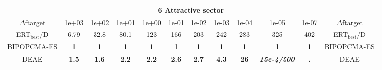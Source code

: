 \begin{tabular}{cccccccccccc}
 & \multicolumn{10}{c}{{\normalsize \textbf{6 Attractive sector}}}\\
$\Delta$ftarget& 1e+03& 1e+02& 1e+01& 1e+00& 1e-01& 1e-02& 1e-03& 1e-04& 1e-05& 1e-07 & $\Delta$ftarget \\
ERT$_{\textrm{best}}$/D& 6.79& 32.8& 80.1& 123& 166& 203& 242& 283& 325& 402 & ERT$_{\textrm{best}}$/D \\
\hline
BIPOPCMA-ES & \textbf{1} & \textbf{1} & \textbf{1} & \textbf{1} & \textbf{1} & \textbf{1} & \textbf{1} & \textbf{1} & \textbf{1} & \textbf{1} & BIPOPCMA-ES \cite{add_an_entry_for_BIPOPCMA-ES_in_bbob.bib}\\
DEAE & \textbf{1.5} & \textbf{1.6} & \textbf{2.2} & \textbf{2.2} & \textbf{2.6} & \textbf{2.7} & \textbf{4.3} & \textbf{26} & \textbf{\textit{15e-4}\textit{/500}} & \textbf{.} & DEAE \cite{add_an_entry_for_DEAE_in_bbob.bib}
\end{tabular}
